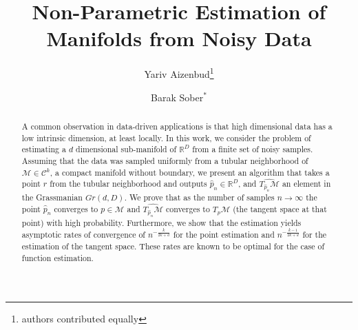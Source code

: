 \documentclass[12pt]{article}
\theoremstyle{remark}
\begin{document}
\title{Non-Parametric Estimation of Manifolds from Noisy Data}
\author[1]{Yariv Aizenbud\footnote{authors contributed equally}}
\author[2]{Barak Sober$^*$}


\maketitle

\begin{abstract}
A common observation in data-driven applications is that high dimensional data has a low intrinsic dimension, at least locally. 
In this work, we consider the problem of estimating a $d$ dimensional sub-manifold of $\mathbb{R}^D$ from a finite set of noisy samples.
Assuming that the data was sampled uniformly from a tubular neighborhood of $\mathcal{M}\in \mathcal{C}^k$, a compact manifold without boundary, we present an algorithm that takes a point $r$ from the tubular neighborhood and outputs $\hat p_n\in \mathbb{R}^D$, and $\widehat{T_{\hat p_n}\mathcal{M}}$ an element in the Grassmanian $Gr(d, D)$.
We prove that as the number of samples $n\to\infty$ the point $\hat p_n$ converges to $p\in \mathcal{M}$ and $\widehat{T_{\hat p_n}\mathcal{M}}$ converges to $T_p\mathcal{M}$ (the tangent space at that point) with high probability.  
Furthermore, we show that the estimation yields asymptotic rates of convergence of $n^{-\frac{k}{2k + d}}$ for the point estimation and $n^{-\frac{k-1}{2k + d}}$ for the estimation of the tangent space.
These rates are known to be optimal for the case of function estimation.
\end{abstract}


\end{document}
